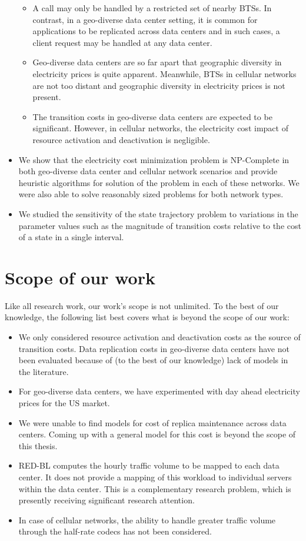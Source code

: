 \begin{itemize}
\begin{itemize}
	\item A call may only be handled by a restricted set of nearby BTSs. In contrast, in a geo-diverse data center setting, it is common for applications to be replicated across data centers and in such cases, a client request may be handled at any data center.
	\item Geo-diverse data centers are so far apart that geographic diversity in electricity prices is quite apparent. Meanwhile, BTSs in cellular networks are not too distant and geographic diversity in electricity prices is not present.
	\item The transition costs in geo-diverse data centers are expected to be significant. However, in cellular networks, the electricity cost impact of resource activation and deactivation is negligible.
	\end{itemize}
\item We show that the electricity cost minimization problem is NP-Complete in both geo-diverse data center and cellular network scenarios and provide heuristic algorithms for solution of the problem in each of these networks. We were also able to solve reasonably sized problems for both network types.
\item We studied the sensitivity of the state trajectory problem to variations in the parameter values such as the magnitude of transition costs relative to the cost of a state in a single interval.
\end{itemize}

\section{Scope of our work} Like all research work, our work's scope is not unlimited. To the best of our knowledge, the following list best covers what is beyond the scope of our work:
\begin{itemize}
\item We only considered resource activation and deactivation costs as the source of transition costs. Data replication costs in geo-diverse data centers have not been evaluated because of (to the best of our knowledge) lack of models in the literature. 
\item For geo-diverse data centers, we have experimented with day ahead electricity prices for the US market. 
\item We were unable to find models for cost of replica maintenance across data centers. Coming up with a general model for this cost is beyond the scope of this thesis.
\item RED-BL computes the hourly traffic volume to be mapped to each data center. It does not provide a mapping of this workload to individual servers within the data center. This is a complementary research problem, which is presently receiving significant research attention.
\item In case of cellular networks, the ability to handle greater traffic volume through the half-rate codecs has not been considered.
\end{itemize}

